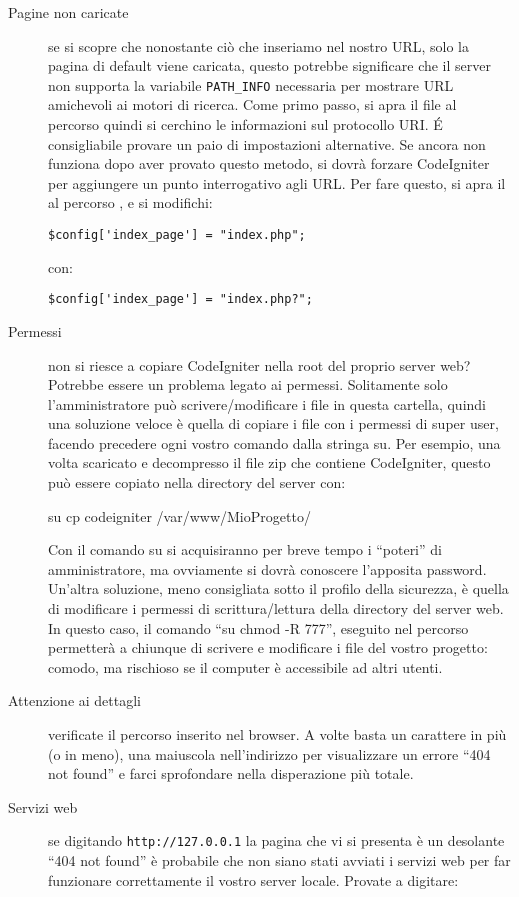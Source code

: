 \begin{description}
\item[Pagine non caricate] se si scopre che nonostante ciò che inseriamo nel nostro \ac{URL}, solo la pagina di default viene caricata, questo potrebbe significare che il server non supporta la variabile \verb|PATH_INFO| necessaria per mostrare \ac{URL} amichevoli ai motori di ricerca. Come primo passo, si apra il file  al percorso  quindi si cerchino le informazioni sul protocollo \ac{URI}. \'E consigliabile provare un paio di impostazioni alternative. Se ancora non funziona dopo aver provato questo metodo, si dovrà forzare CodeIgniter per aggiungere un punto interrogativo agli \ac{URL}. Per fare questo, si apra il  al percorso , e si modifichi:

\verb|$config['index_page'] = "index.php";|

con:

\verb|$config['index_page'] = "index.php?";|

\item [Permessi] non si riesce a copiare CodeIgniter nella root del proprio server web? Potrebbe essere un problema legato ai permessi. Solitamente solo l'amministratore può scrivere/modificare i file in questa cartella, quindi una soluzione veloce è quella di copiare i file con i permessi di super user, facendo precedere ogni vostro comando dalla stringa \ac{su}. Per esempio, una volta scaricato e decompresso il file zip che contiene CodeIgniter, questo può essere copiato nella directory del server con:

\begin{code}
su cp codeigniter /var/www/MioProgetto/
\end{code}

Con il comando \ac{su} si acquisiranno per breve tempo i ``poteri'' di amministratore, ma ovviamente si dovrà conoscere l'apposita password. Un'altra soluzione, meno consigliata sotto il profilo della sicurezza, è quella di modificare i permessi di scrittura/lettura della directory del server web. In questo caso, il comando ``su chmod -R 777'', eseguito nel percorso  permetterà a chiunque di scrivere e modificare i file del vostro progetto: comodo, ma rischioso se il computer è accessibile ad altri utenti.
\item[Attenzione ai dettagli] verificate il percorso inserito nel browser. A volte basta un carattere in più (o in meno), una maiuscola nell'indirizzo per visualizzare un errore ``404 not found'' e farci sprofondare nella disperazione più totale.
\item[Servizi web] se digitando \verb|http://127.0.0.1| la pagina che vi si presenta è un desolante ``404 not found'' è probabile che non siano stati avviati i servizi web per far funzionare correttamente il vostro server locale. Provate a digitare:


\end{description}
